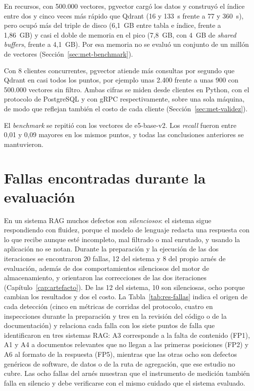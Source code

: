 En recursos, con 500.000 vectores, pgvector cargó los datos y construyó el índice entre dos y cinco veces más rápido que Qdrant (16 y 133~s frente a 77 y 360~s), pero ocupó más del triple de disco (6,1~GB entre tabla e índice, frente a 1,86~GB) y casi el doble de memoria en el pico (7,8~GB, con 4~GB de \textit{shared buffers}, frente a 4,1~GB). Por esa memoria no se evaluó un conjunto de un millón de vectores (Sección~\ref{sec:met-benchmark}).

Con 8 clientes concurrentes, pgvector atiende más consultas por segundo que Qdrant en casi todos los puntos, por ejemplo unas 2.400 frente a unas 900 con 500.000 vectores sin filtro. Ambas cifras se miden desde clientes en Python, con el protocolo de PostgreSQL y con gRPC respectivamente, sobre una sola máquina, de modo que reflejan también el costo de cada cliente (Sección~\ref{sec:met-validez}).

El \textit{benchmark} se repitió con los vectores de e5-base-v2. Los \textit{recall} fueron entre 0,01 y 0,09 mayores en los mismos puntos, y todas las conclusiones anteriores se mantuvieron.

\section{Fallas encontradas durante la evaluación}
\label{sec:res-fallas}

En un sistema RAG muchos defectos son \emph{silenciosos}: el sistema sigue respondiendo con fluidez, porque el modelo de lenguaje redacta una respuesta con lo que recibe aunque esté incompleto, mal filtrado o mal enrutado, y usando la aplicación no se notan. Durante la preparación y la ejecución de las dos iteraciones se encontraron 20 fallas, 12 del sistema y 8 del propio arnés de evaluación, además de dos comportamientos silenciosos del motor de almacenamiento, y orientaron las correcciones de las dos iteraciones (Capítulo~\ref{cap:artefacto}). De las 12 del sistema, 10 son silenciosas, ocho porque cambian los resultados y dos el costo. La Tabla~\ref{tab:res-fallas} indica el origen de cada detección (cinco en métricas de corridas del protocolo, cuatro en inspecciones durante la preparación y tres en la revisión del código o de la documentación) y relaciona cada falla con los siete puntos de falla que \citet{Barnett2024} identificaron en tres sistemas RAG: A3 corresponde a la falta de contenido (FP1), A1 y A4 a documentos relevantes que no llegan a las primeras posiciones (FP2) y A6 al formato de la respuesta (FP5), mientras que las otras ocho son defectos genéricos de software, de datos o de la ruta de agregación, que ese estudio no cubre. Las ocho fallas del arnés muestran que el instrumento de medición también falla en silencio y debe verificarse con el mismo cuidado que el sistema evaluado.

